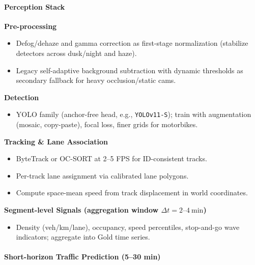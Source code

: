 \paragraph{Perception Stack}
\mbox{}\newline
\textbf{Pre-processing}
\begin{itemize}
  \item Defog/dehaze and gamma correction as first-stage normalization (stabilize detectors across dusk/night and haze).
  \item Legacy self-adaptive background subtraction with dynamic thresholds as secondary fallback for heavy occlusion/static cams.
\end{itemize}
	\textbf{Detection}
\begin{itemize}
  \item YOLO family (anchor-free head, e.g., \texttt{YOLOv11-S}); train with augmentation (mosaic, copy-paste), focal loss, finer grids for motorbikes.
\end{itemize}
	\textbf{Tracking \& Lane Association}
\begin{itemize}
  \item ByteTrack or OC-SORT at 2--5 FPS for ID-consistent tracks.
  \item Per-track lane assignment via calibrated lane polygons.
  \item Compute space-mean speed from track displacement in world coordinates.
\end{itemize}
	\textbf{Segment-level Signals (aggregation window $\Delta t = 2\text{--}4\ \text{min}$)}
\begin{itemize}
  \item Density (veh/km/lane), occupancy, speed percentiles, stop-and-go wave indicators; aggregate into Gold time series.
\end{itemize}

\paragraph{Short-horizon Traffic Prediction (5--30 min)} 


